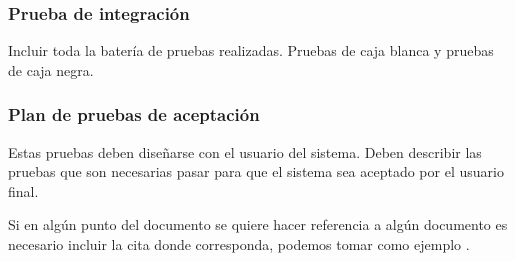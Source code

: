 \subsubsection{Prueba de integración}

Incluir toda la batería de pruebas realizadas. Pruebas de caja blanca y pruebas de caja negra.  


\subsubsection{ Plan de pruebas de aceptación}

Estas pruebas deben diseñarse con el usuario del sistema. Deben describir las pruebas que son necesarias pasar para que el sistema sea aceptado por el usuario final.  

\bigskip

Si en algún punto del documento se quiere hacer referencia a algún documento es necesario incluir la cita donde corresponda, podemos tomar como ejemplo \cite{Ejemplo3}. 